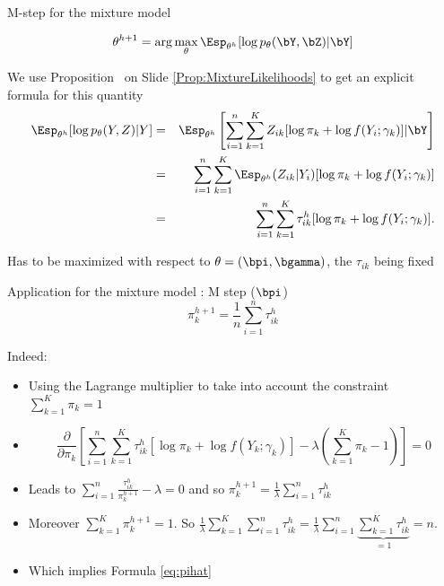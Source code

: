 \documentclass[compress,10pt]{beamer}
\begin{document}
\begin{frame}{M-step for the mixture model}

$$\theta^{h+1} = \arg\max_\theta \Esp_{\theta^h}[\log p_\theta(\bY, \bZ) |\bY]$$

We use Proposition~ on Slide \ref{Prop:MixtureLikelihoods} to get an explicit formula for this quantity
\begin{eqnarray*}
  \Esp_{\theta^h}[\log p_\theta(Y, Z) |Y] & = & \Esp_{\theta^h}\left[\sum_{i=1}^n \sum_{k=1}^K Z_{ik} [\log \pi_k + \log f(Y_i; \gamma_k)] |\bY\right] \\
  & = &\sum_{i=1}^n \sum_{k=1}^K \Esp_{\theta^h}(Z_{ik}|Y_i) [\log \pi_k + \log f(Y_i; \gamma_k)] \\
  & = & \sum_{i=1}^n \sum_{k=1}^K\tau_{ik}^h [\log \pi_k + \log f(Y_i; \gamma_k)]. 
\end{eqnarray*}

\centering Has to be maximized with respect to $\theta = (\bpi, \bgamma)$, the $\tau_{ik}$ being fixed

\end{frame}
\begin{frame}[allowframebreaks]{Application for the mixture model : M step ($\bpi$)}
\begin{equation}\label{eq:pihat}
\pi^{h+1}_k = \frac{1}{n} \sum_{i=1}^n \tau^h_{ik}
\end{equation}

Indeed: 

\begin{itemize}
 \item  Using the  Lagrange multiplier to take into account the constraint $  \sum_{k=1}^K \pi_k= 1$
\item $$  \frac{\partial}{\partial \pi_k} \left[
  \sum_{i=1}^n \sum_{k=1}^K\tau_{ik}^h [\log \pi_k + \log f(Y_k; \gamma_k)] - \lambda \left(\sum_{k=1}^K \pi_k-1\right)\right] = 0 $$ 
  \item Leads to 
  $ \sum_{i=1}^n \frac{\tau_{ik}^h}{\pi_k^{h+1}} -\lambda = 0$ and so $\pi_k^{h+1} =  \frac{1}{\lambda}\sum_{i=1}^n\tau_{ik}^h$
\item  Moreover $  \sum_{k=1}^K \pi^{h+1}_k= 1$. So $ \frac{1}{\lambda}\sum_{k=1}^K \sum_{i=1}^n\tau_{ik}^h = \frac{1}{\lambda}\sum_{i=1}^n\underbrace{\sum_{k=1}^K \tau_{ik}^h}_{=1} = n$. 
\item Which implies Formula \eqref{eq:pihat}
 
\end{itemize}
 

 
 
 
 
  
\end{frame}
\end{document}
